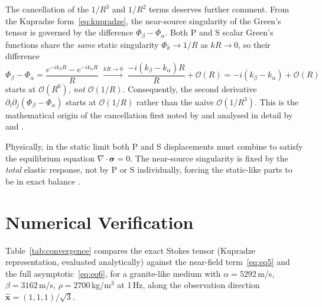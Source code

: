 \documentclass[11pt,a4paper]{article}
\newcommand{\bx}{\mathbf{x}}
\newcommand{\order}[1]{\mathcal{O}\!\left(#1\right)}
\begin{document}
The cancellation of the $1/R^3$ and $1/R^2$ terms deserves further
comment. From the Kupradze form~\eqref{eq:kupradze}, the near-source
singularity of the Green's tensor is governed by the difference
$\Phi_\beta - \Phi_\alpha$. Both P and S scalar Green's functions share
the \emph{same} static singularity
$\Phi_k \to 1/R$ as $kR \to 0$, so their difference
\begin{equation}
  \Phi_\beta - \Phi_\alpha
  = \frac{e^{-ik_\beta R} - e^{-ik_\alpha R}}{R}
  \;\xrightarrow{kR \to 0}\;
  \frac{-i(k_\beta - k_\alpha)R}{R} + \order{R}
  = -i(k_\beta - k_\alpha) + \order{R}
  \label{eq:phi_diff}
\end{equation}
starts at $\order{R^0}$, \emph{not} $\order{1/R}$.  Consequently, the
second derivative $\partial_i\partial_j(\Phi_\beta - \Phi_\alpha)$
starts at $\order{1/R}$ rather than the naïve $\order{1/R^3}$.  This
is the mathematical origin of the cancellation first noted by
\citet{Pendse1948} and analysed in detail by \citet{MorseFeshbach1953}
and \citet{WuBenMenahem1985}.

Physically, in the static limit both P and S displacements must
combine to satisfy the equilibrium equation $\nabla \cdot \symbf{\sigma}
= 0$. The near-source singularity is fixed by the \emph{total}
elastic response, not by P or S individually, forcing the static-like
parts to be in exact balance \citep{BenMenahemSingh1981,Harkrider1976}.

\section{Numerical Verification}

Table~\ref{tab:convergence} compares the exact Stokes tensor
(Kupradze representation, evaluated analytically) against the
near-field term~\eqref{eq:eq5} and the full
asymptotic~\eqref{eq:eq6}, for a granite-like medium with
$\alpha = 5292$\,m/s, $\beta = 3162$\,m/s, $\rho = 2700$\,kg/m$^3$
at 1\,Hz, along the observation direction
$\hat{\bx} = (1,1,1)/\sqrt{3}$.
\end{document}

